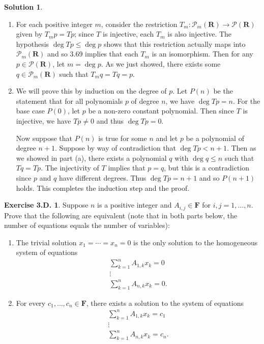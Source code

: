 \documentclass[12pt]{article}
\theoremstyle{definition}
\theoremstyle{exercise}
\newtheorem{exercise}{Exercise 3.D.}
\theoremstyle{solution}
\newtheorem*{solution}{Solution}
\newcommand{\poly}{\mathcal{P}}
\newcommand{\R}{\mathbf{R}}
\newcommand{\F}{\mathbf{F}}
\begin{document}
\begin{solution}
    \begin{enumerate}
        \item For each positive integer \( m \), consider the restriction \( T_m : \poly_m(\R) \to \poly(\R) \) given by \( T_m p = Tp \); since \( T \) is injective, each \( T_m \) is also injective. The hypothesis \( \deg Tp \leq \deg p \) shows that this restriction actually maps into \( \poly_m(\R) \) and so 3.69 implies that each \( T_m \) is an isomorphism. Then for any \( p \in \poly(\R) \), let \( m = \deg p \). As we just showed, there exists some \( q \in \poly_m(\R) \) such that \( T_m q = Tq = p \).

        \item We will prove this by induction on the degree of \( p \). Let \( P(n) \) be the statement that for all polynomials \( p \) of degree \( n \), we have \( \deg Tp = n \). For the base case \( P(0) \), let \( p \) be a non-zero constant polynomial. Then since \( T \) is injective, we have \( Tp \neq 0 \) and thus \( \deg Tp = 0 \).

        Now suppose that \( P(n) \) is true for some \( n \) and let \( p \) be a polynomial of degree \( n + 1 \). Suppose by way of contradiction that \( \deg Tp < n + 1 \). Then as we showed in part (a), there exists a polynomial \( q \) with \( \deg q \leq n \) such that \( Tq = Tp \). The injectivity of \( T \) implies that \( p = q \), but this is a contradiction since \( p \) and \( q \) have different degrees. Thus \( \deg Tp = n + 1 \) and so \( P(n+1) \) holds. This completes the induction step and the proof.
    \end{enumerate}
\end{solution}

\begin{exercise}
\label{ex:20}
    Suppose \( n \) is a positive integer and \( A_{i,j} \in \F \) for \( i, j = 1, \ldots, n \). Prove that the following are equivalent (note that in both parts below, the number of equations equals the number of variables):
    \begin{enumerate}
        \item The trivial solution \( x_1 = \cdots = x_n = 0 \) is the only solution to the homogeneous system of equations
        \begin{gather*}
            \sum_{k=1}^n A_{1,k} x_k = 0 \\
            \vdots \\
            \sum_{k=1}^n A_{n,k} x_k = 0.
        \end{gather*}

        \item For every \( c_1, \ldots, c_n \in \F \), there exists a solution to the system of equations
        \begin{gather*}
            \sum_{k=1}^n A_{1,k} x_k = c_1 \\
            \vdots \\
            \sum_{k=1}^n A_{n,k} x_k = c_n.
        \end{gather*}
    \end{enumerate}
\end{exercise}
\end{document}
